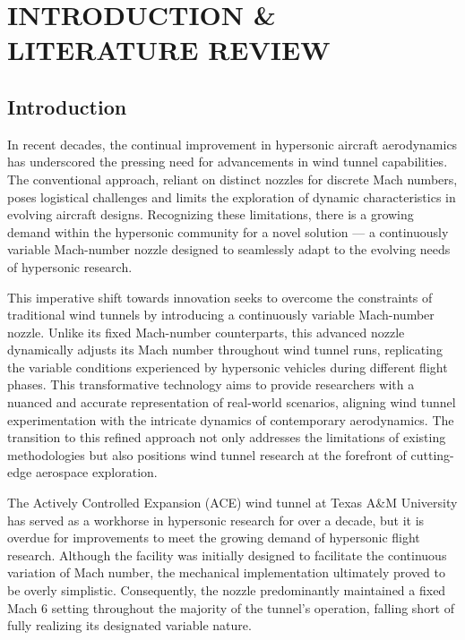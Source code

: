 %
%  
%



\pagestyle{plain} %
\setcounter{page}{1}


\chapter{INTRODUCTION \& LITERATURE REVIEW}

\section{Introduction}

In recent decades, the continual improvement in hypersonic aircraft aerodynamics has underscored the pressing need for advancements in wind tunnel capabilities. The conventional approach, reliant on distinct nozzles for discrete Mach numbers, poses logistical challenges and limits the exploration of dynamic characteristics in evolving aircraft designs. Recognizing these limitations, there is a growing demand within the hypersonic community for a novel solution — a continuously variable Mach-number nozzle designed to seamlessly adapt to the evolving needs of hypersonic research.

This imperative shift towards innovation seeks to overcome the constraints of traditional wind tunnels by introducing a continuously variable Mach-number nozzle. Unlike its fixed Mach-number counterparts, this advanced nozzle dynamically adjusts its Mach number throughout wind tunnel runs, replicating the variable conditions experienced by hypersonic vehicles during different flight phases. This transformative technology aims to provide researchers with a nuanced and accurate representation of real-world scenarios, aligning wind tunnel experimentation with the intricate dynamics of contemporary aerodynamics. The transition to this refined approach not only addresses the limitations of existing methodologies but also positions wind tunnel research at the forefront of cutting-edge aerospace exploration.

The Actively Controlled Expansion (ACE) wind tunnel at Texas A\&M University has served as a workhorse in hypersonic research for over a decade, but it is overdue for improvements to meet the growing demand of hypersonic flight research. Although the facility was initially designed to facilitate the continuous variation of Mach number, the mechanical implementation ultimately proved to be overly simplistic. Consequently, the nozzle predominantly maintained a fixed Mach 6 setting throughout the majority of the tunnel's operation, falling short of fully realizing its designated variable nature.

